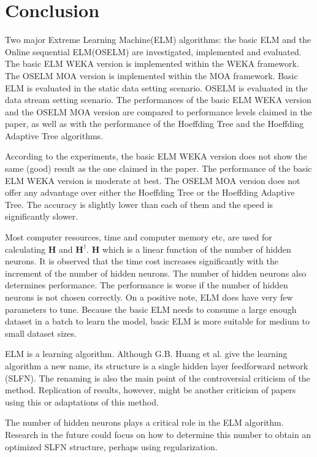 \documentclass[a4paper, 14pt]{extarticle}
\begin{document}
\section{Conclusion}
\par Two major Extreme Learning Machine(ELM) algorithms: the basic ELM and the Online sequential ELM(OSELM) are investigated, implemented and evaluated. The basic ELM WEKA version is implemented within the WEKA framework. The OSELM MOA version is implemented within the MOA framework. Basic ELM is evaluated in the static data setting scenario. OSELM is evaluated in the data stream setting scenario. The performances of the basic ELM WEKA version and the OSELM MOA version are compared to performance levels claimed in the paper\cite{G.B.Huang-ICNN}, as well as with the performance of the Hoeffding Tree and the Hoeffding Adaptive Tree algorithms. 
\par According to the experiments, the basic ELM WEKA version does not show the same (good) result as the one claimed in the paper\cite{G.B.Huang-ICNN}. The performance of the basic ELM WEKA version is moderate at best. The OSELM MOA version does not offer any advantage over either the Hoeffding Tree or the Hoeffding Adaptive Tree. The accuracy is slightly lower than each of them and the speed is significantly slower.
\par Most computer resources, time and computer memory etc, are used for calculating \(\mathbf{H}\) and \(\mathbf{H}^\dagger\). \(\mathbf{H}\) which is a linear function of the number of hidden neurons. It is observed that the time cost increases significantly with the increment of the number of hidden neurons. The number of hidden neurons also determines performance. The performance is worse if the number of hidden neurons is not chosen correctly. On a positive note, ELM does have very few parameters to tune. Because the basic ELM needs to consume a large enough dataset in a batch to learn the model, basic ELM is more suitable for medium to small dataset sizes. 
\par ELM is a learning algorithm. Although G.B. Huang et al. give the learning algorithm a new name, its structure is a single hidden layer feedforward network (SLFN). The renaming is also the main point of the controversial criticism of the method. Replication of results, however, might be another criticism of papers using this or adaptations of this method. 
\par The number of hidden neurons plays a critical role in the ELM algorithm. Research in the future could focus on how to determine this number to obtain an optimized SLFN structure, perhaps using regularization. 
\newpage



\end{document}
